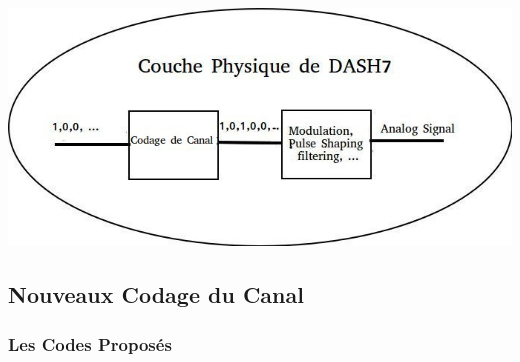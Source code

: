 \documentclass[8pt]{beamer}
\newcommand{\1}{\mathbbm 1}
\begin{document}
\begin{frame}
\begin{center}
\includegraphics[scale=0.48]{figures/physique.jpg}
\end{center}

\end{frame}

\subsection{Nouveaux Codage du Canal}

\subsubsection{Les Codes Proposés}
\end{document}
